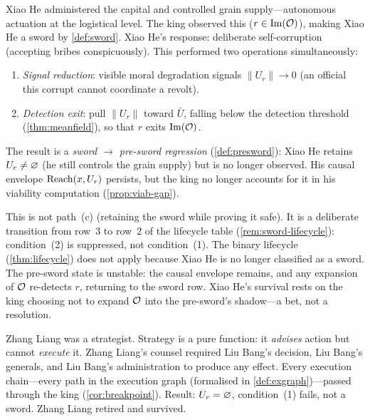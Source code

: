 \begin{example}
\label{ex:xiaohe}
Xiao He administered the capital and controlled grain supply---autonomous
actuation at the logistical level. The king observed this
($r \in \mathrm{Im}(\mathcal{O})$), making Xiao He a sword by
\cref{def:sword}. Xiao He's response: deliberate self-corruption
(accepting bribes conspicuously). This performed two operations
simultaneously:
\begin{enumerate}[label=(\roman*)]
  \item \emph{Signal reduction}: visible moral degradation signals
  $\|U_r\| \to 0$ (an official this corrupt cannot coordinate a revolt).
  \item \emph{Detection exit}: pull $\|U_r\|$ toward $\bar{U}$,
  falling below the detection threshold (\cref{thm:meanfield}),
  so that $r$ exits $\mathrm{Im}(\mathcal{O})$.
\end{enumerate}
The result is a \emph{sword $\to$ pre-sword regression}
(\cref{def:presword}): Xiao He retains $U_r \neq \varnothing$
(he still controls the grain supply) but is no longer observed.
His causal envelope $\mathrm{Reach}(x, U_r)$ persists, but the
king no longer accounts for it in his viability computation
(\cref{prop:viab-gap}).

This is not path~(c) (retaining the sword while proving it safe).
It is a deliberate transition from row~3 to row~2 of the lifecycle
table (\cref{rem:sword-lifecycle}): condition~(2) is suppressed,
not condition~(1).  The binary lifecycle (\cref{thm:lifecycle})
does not apply because Xiao He is no longer classified as a sword.
The pre-sword state is unstable: the causal envelope remains, and
any expansion of $\mathcal{O}$ re-detects $r$, returning to the sword row.
Xiao He's survival rests on the king choosing not to expand $\mathcal{O}$
into the pre-sword's shadow---a bet, not a resolution.
\end{example}

\begin{example}\label{ex:zhangliang}
Zhang Liang was a strategist. Strategy is a pure function: it
\emph{advises} action but cannot \emph{execute} it. Zhang Liang's
counsel required Liu Bang's decision, Liu Bang's generals, and Liu
Bang's administration to produce any effect. Every execution
chain---every path in the execution graph (formalised in
\cref{def:exgraph})---passed through the king
(\cref{cor:breakpoint}). Result:
$U_r = \varnothing$, condition~(1) fails, not a sword.
Zhang Liang retired and survived.
\end{example}
